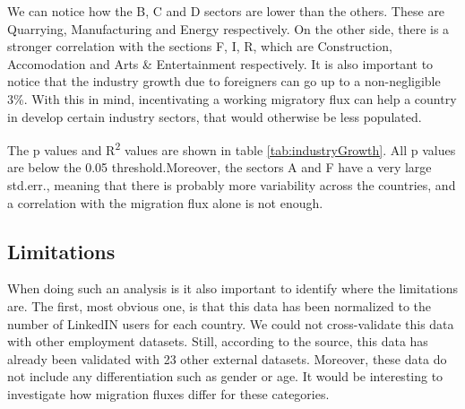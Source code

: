 \documentclass[
]{article}
\begin{document}
We can notice how the B, C and D sectors are lower than the others.
These are Quarrying, Manufacturing and Energy respectively. On the other
side, there is a stronger correlation with the sections F, I, R, which
are Construction, Accomodation and Arts \& Entertainment respectively.
It is also important to notice that the industry growth due to
foreigners can go up to a non-negligible 3\%. With this in mind,
incentivating a working migratory flux can help a country in develop
certain industry sectors, that would otherwise be less populated.

The p values and R\textsuperscript{2} values are shown in table
\ref{tab:industryGrowth}. All p values are below the 0.05
threshold.Moreover, the sectors A and F have a very large std.err.,
meaning that there is probably more variability across the countries,
and a correlation with the migration flux alone is not enough.

\hypertarget{limitations}{%
\subsection{Limitations}\label{limitations}}

When doing such an analysis is it also important to identify where the
limitations are. The first, most obvious one, is that this data has been
normalized to the number of LinkedIN users for each country. We could
not cross-validate this data with other employment datasets. Still,
according to the source, this data has already been validated with 23
other external datasets. Moreover, these data do not include any
differentiation such as gender or age. It would be interesting to
investigate how migration fluxes differ for these categories.
\end{document}
